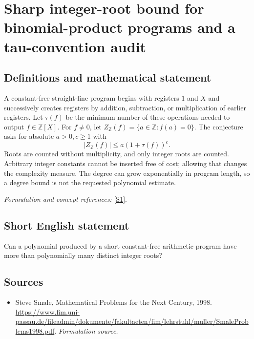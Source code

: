 \documentclass[11pt]{article}
\begin{document}
\section*{\texorpdfstring{Sharp integer-root bound for binomial-product programs and a tau-convention audit}{Sharp integer-root bound for binomial-product programs and a tau-convention audit}}\label{20002353}
\subsection{Definitions and mathematical statement}
A constant-free straight-line program begins with registers $1$ and $X$ and successively creates registers by addition, subtraction, or multiplication of earlier registers. Let $\tau(f)$ be the minimum number of these operations needed to output $f\in{\mathbb{Z}}[X]$. For $f\ne0$, let $Z_{{\mathbb{Z}}}(f)=\{a\in{\mathbb{Z}}:f(a)=0\}$. The conjecture asks for absolute $a>0,c\ge1$ with
\[
 |Z_{{\mathbb{Z}}}(f)|\le a(1+\tau(f))^c.
\]
Roots are counted without multiplicity, and only integer roots are counted. Arbitrary integer constants cannot be inserted free of cost; allowing that changes the complexity measure. The degree can grow exponentially in program length, so a degree bound is not the requested polynomial estimate.
\par\smallskip\textit{Formulation and concept references:} \href{https://www.fim.uni-passau.de/fileadmin/dokumente/fakultaeten/fim/lehrstuhl/muller/SmaleProblems1998.pdf}{[S1]}.

\subsection{Short English statement}
Can a polynomial produced by a short constant-free arithmetic program have more than polynomially many distinct integer roots?
\subsection{Sources}
\begin{itemize}
\item[S1]Steve Smale, Mathematical Problems for the Next Century, 1998.
\url{https://www.fim.uni-passau.de/fileadmin/dokumente/fakultaeten/fim/lehrstuhl/muller/SmaleProblems1998.pdf}.
\textit{Formulation source.}
\end{itemize}
\end{document}
